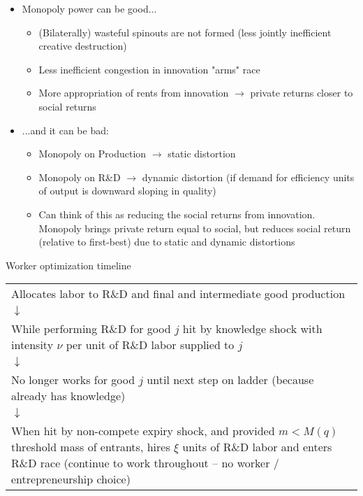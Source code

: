 \begin{frame}
\begin{itemize}
	\item Monopoly power can be good...
	\begin{itemize}
		\item (Bilaterally) wasteful spinouts are not formed (less jointly inefficient creative destruction)
		\item Less inefficient congestion in innovation "arms" race
		\item More appropriation of rents from innovation $\rightarrow$ private returns closer to social returns 
	\end{itemize}
	\item ...and it can be bad:
	\begin{itemize}
		\item Monopoly on Production $\rightarrow$ static distortion
		\item Monopoly on R\&D $\rightarrow$ dynamic distortion (if demand for efficiency units of output is downward sloping in quality)
		\item Can think of this as reducing the social returns from innovation. Monopoly brings private return equal to social, but reduces social return (relative to first-best) due to static and dynamic distortions
	\end{itemize}
\end{itemize}
\end{frame}

\begin{frame}{Worker optimization timeline}
\begin{table}
	\begin{tabular}{p{}}
		\centering
		Allocates labor to R\&D and final and intermediate good production \\
		$\downarrow$\\
		While performing R\&D for good $j$ hit by knowledge shock with intensity $\nu$ per unit of R\&D labor supplied to $j$ \\
		$\downarrow$\\
		No longer works for good $j$ until next step on ladder (because already has knowledge) \\
		$\downarrow$\\
		When hit by non-compete expiry shock, and provided $m<M(q)$ threshold mass of entrants, hires $\xi$ units of R\&D labor and enters R\&D race (continue to work throughout -- no worker / entrepreneurship choice)
	\end{tabular}
\end{table}
\end{frame}

